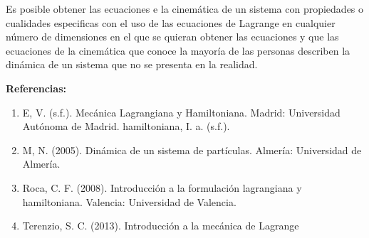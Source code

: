 \documentclass{article}
\begin{document}
\begin{multicols}{2}
\vspace*{-0.5cm}
Es posible obtener las ecuaciones e la cinemática de un
sistema con propiedades o cualidades especificas con el
uso de las ecuaciones de Lagrange en cualquier número
de dimensiones en el que se quieran obtener las ecuaciones
y que las ecuaciones de la cinemática que conoce
la mayoría de las personas describen la dinámica de
un sistema que no se presenta en la realidad.\\
\changefontsizes{8pt}
\begin{center}
\textbf{
Referencias:
}
\end{center}
\begin{enumerate}
\item E, V. (s.f.). Mecánica Lagrangiana y Hamiltoniana. Madrid: Universidad Autónoma de Madrid.
hamiltoniana, I. a. (s.f.).
\item M, N. (2005). Dinámica de un sistema de partículas. Almería: Universidad de Almería.
\item Roca, C. F. (2008). Introducción a la formulación lagrangiana y hamiltoniana. Valencia: Universidad de Valencia.
\item Terenzio, S. C. (2013). Introducción a la mecánica de Lagrange
\end{enumerate}
\end{multicols}
\end{document}
